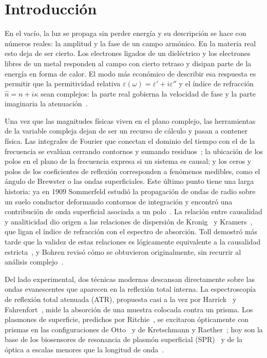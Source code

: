 \documentclass[11pt,letterpaper]{article}
\newcommand{\nh}{\hat{n}}
\newcommand{\eps}{\varepsilon}
\begin{document}
\section{Introducción}

En el vacío, la luz se propaga sin perder energía y su descripción se hace con
números reales: la amplitud y la fase de un campo armónico. En la materia real
esto deja de ser cierto. Los electrones ligados de un dieléctrico y los
electrones libres de un metal responden al campo con cierto retraso y disipan
parte de la energía en forma de calor. El modo más económico de describir esa
respuesta es permitir que la permitividad relativa
$\eps(\omega)=\eps'+i\eps''$ y el índice de refracción $\nh=n+i\kappa$ sean
complejos: la parte real gobierna la velocidad de fase y la parte imaginaria la
atenuación~\cite{Jackson,BornWolf}.

Una vez que las magnitudes físicas viven en el plano complejo, las herramientas
de la variable compleja dejan de ser un recurso de cálculo y pasan a contener
física. Las integrales de Fourier que conectan el dominio del tiempo con el de
la frecuencia se evalúan cerrando contornos y sumando residuos~\cite{Arfken};
la ubicación de los polos en el plano de la frecuencia expresa si un sistema es
causal; y los ceros y polos de los coeficientes de reflexión corresponden a
fenómenos medibles, como el ángulo de Brewster o las ondas superficiales. Este
último punto tiene una larga historia: ya en 1909 Sommerfeld estudió la
propagación de ondas de radio sobre un suelo conductor deformando contornos de
integración y encontró una contribución de onda superficial asociada a un
polo~\cite{Sommerfeld}. La relación entre causalidad y analiticidad dio origen
a las relaciones de dispersión de Kronig~\cite{Kronig} y
Kramers~\cite{Kramers}, que ligan el índice de refracción con el espectro de
absorción. Toll demostró más tarde que la validez de estas relaciones es
lógicamente equivalente a la causalidad estricta~\cite{Toll}, y Bohren revisó
cómo se obtuvieron originalmente, sin recurrir al análisis
complejo~\cite{Bohren}.

Del lado experimental, dos técnicas modernas descansan directamente sobre las
ondas evanescentes que aparecen en la reflexión total interna. La
espectroscopía de reflexión total atenuada (ATR), propuesta casi a la vez por
Harrick~\cite{Harrick} y Fahrenfort~\cite{Fahrenfort}, mide la absorción de una
muestra colocada contra un prisma. Los plasmones de superficie, predichos por
Ritchie~\cite{Ritchie}, se excitaron ópticamente con prismas en las
configuraciones de Otto~\cite{Otto} y de Kretschmann y Raether~\cite{Kretschmann};
hoy son la base de los biosensores de resonancia de plasmón superficial
(SPR)~\cite{Homola} y de la óptica a escalas menores que la longitud de
onda~\cite{Barnes,Zayats}.
\end{document}
